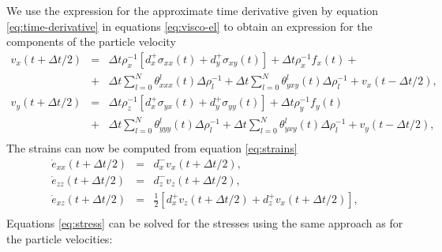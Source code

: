 \documentclass[11pt]{article}
\begin{document}
We use the expression for the approximate time derivative given by 
equation \eqref{eq:time-derivative}
in equations \eqref{eq:visco-el} to obtain an expression for the 
components of the particle velocity
\begin{eqnarray}
v_x(t+\Delta t/2) 
      & = & \Delta t\rho_x^{-1}\left[d^+_x \sigma_{xx}(t) 
            +d^+_y \sigma_{xy}(t)\right] 
            + \Delta t \rho_x^{-1}f_x(t) +                    \nonumber\\ 
      & + & \Delta t\sum_{l=0}^N\theta^l_{xxx}(t)\Delta\rho^{-1}_{l}
            + \Delta t\sum_{l=0}^N\theta^l_{yxy}(t)\Delta\rho^{-1}_{l} 
            +v_x(t-\Delta t/2),\nonumber\\
v_y(t+\Delta t/2) & = &  \Delta t \rho_z^{-1}\left[d^+_x \sigma_{yx}(t) 
                        +d^+_y \sigma_{yy}(t)\right] 
                        +\Delta t \rho_y^{-1}f_y(t)\nonumber\\  
      & + & \Delta t\sum_{l=0}^N\theta^l_{yyy}(t)\Delta\rho^{-1}_{l}
            +  \Delta t\sum_{l=0}^N\theta^l_{yxy}(t)\Delta\rho^{-1}_{l} 
            +v_y(t-\Delta t/2),\nonumber\\
                       \label{eq:vi-2d}
\end{eqnarray}
The strains can now be computed from equation \eqref{eq:strains}
\begin{eqnarray}
  \dot{e}_{xx}(t+\Delta t/2) & = & d^-_x v_x(t+\Delta t/2),     \nonumber  \\
  \dot{e}_{zz}(t+\Delta t/2) & = & d^-_z v_z(t+\Delta t/2),     \nonumber  \\
  \dot{e}_{xz}(t+\Delta t/2) & = & \frac{1}{2}\left[d^+_x v_z(t+\Delta t/2) 
                             + d^+_z v_x(t+\Delta t/2)\right], \nonumber   \\
                       \label{eq:strain2d}
\end{eqnarray}
%
Equations \eqref{eq:stress}   can be solved for the stresses using 
the same approach as for the particle velocities:
\end{document}
